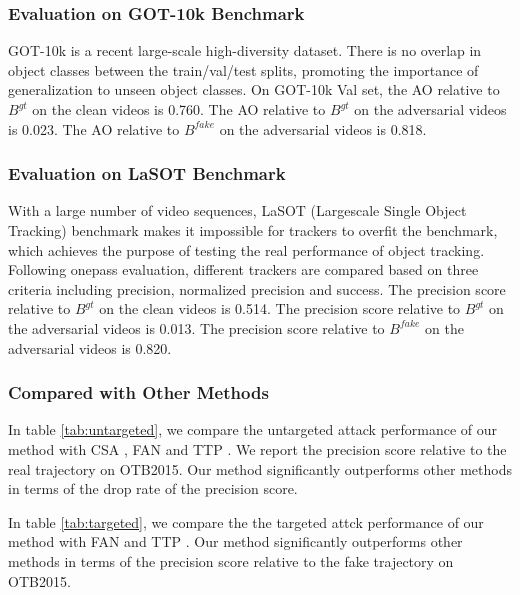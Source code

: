 \documentclass{article}
\begin{document}
\subsubsection{Evaluation on GOT-10k Benchmark}

GOT-10k \cite{GOT-10k} is a recent large-scale high-diversity dataset. There is no overlap in object classes between the train/val/test splits, promoting the importance of generalization to unseen object classes.
On GOT-10k Val set, the AO relative to $B^{gt}$ on the clean videos is 0.760. The AO relative to $B^{gt}$ on the adversarial videos is 0.023. The AO relative to $B^{fake}$ on the adversarial videos is 0.818.

\subsubsection{Evaluation on LaSOT Benchmark}

With a large number of video sequences, LaSOT (Largescale Single Object Tracking) benchmark makes it impossible for trackers to overfit the benchmark, which achieves the purpose of testing the real performance of object tracking.
Following onepass evaluation, different trackers are compared based on three criteria including precision, normalized precision and success.
The precision score relative to $B^{gt}$ on the clean videos is 0.514. The precision score relative to $B^{gt}$ on the adversarial videos is 0.013. The precision score relative to $B^{fake}$ on the adversarial videos is 0.820.

\subsubsection{Compared with Other Methods}

In table \ref{tab:untargeted}, we compare the untargeted attack performance of our method with CSA \cite{CSA}, FAN \cite{FAN} and TTP \cite{TTP}.
We report the precision score relative to the real trajectory on OTB2015.
Our method significantly outperforms other methods in terms of the drop rate of the precision score.

In table \ref{tab:targeted}, we compare the the targeted attck performance of our method with FAN \cite{FAN} and TTP \cite{TTP}.
Our method significantly outperforms other methods in terms of the precision score relative to the fake trajectory on OTB2015.
\end{document}
